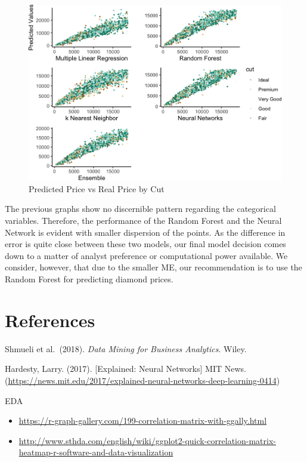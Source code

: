 \documentclass[
  paper=a4,
  ,captions=tableheading
]{scrartcl}
\providecommand{\tightlist}{%
  \setlength{\itemsep}{0pt}\setlength{\parskip}{0pt}}
\begin{document}
\begin{figure}[H]

{\centering \includegraphics[width=\linewidth,]{Diamonds_PDF_files/figure-latex/Summ Cut Plots-1}

}

\caption{Predicted Price vs Real Price by Cut}\label{fig:Summ Cut Plots}
\end{figure}

The previous graphs show no discernible pattern regarding the
categorical variables. Therefore, the performance of the Random Forest
and the Neural Network is evident with smaller dispersion of the points.
As the difference in error is quite close between these two models, our
final model decision comes down to a matter of analyst preference or
computational power available. We consider, however, that due to the
smaller ME, our recommendation is to use the Random Forest for
predicting diamond prices.

\newpage

\hypertarget{references}{%
\section{References}\label{references}}

Shmueli et al.~(2018). \emph{Data Mining for Business Analytics}. Wiley.

Hardesty, Larry. (2017). {[}Explained: Neural Networks{]} MIT News.
(\url{https://news.mit.edu/2017/explained-neural-networks-deep-learning-0414})

EDA

\begin{itemize}
\tightlist
\item
  \url{https://r-graph-gallery.com/199-correlation-matrix-with-ggally.html}
\item
  \url{http://www.sthda.com/english/wiki/ggplot2-quick-correlation-matrix-heatmap-r-software-and-data-visualization}
\end{itemize}
\end{document}

